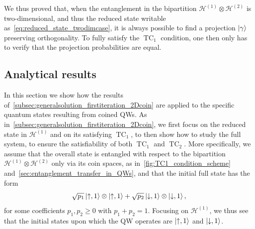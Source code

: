 \documentclass[
	aps, pra,
	superscriptaddress, twocolumn,
	floatfix,
	10pt
]{revtex4-1}
\newcommand{\on}[1]{\operatorname{#1}}
\newcommand{\parTitle}[1]{\noindent{\color{Mahogany}(\emph{#1})}}
\newcommand{\calH}{{\mathcal{H}}}
\newcommand{\commale}[1]{{\textcolor{red} {\it{[Note (Ale): #1]}}}}
\begin{document}
We thus proved that, when the entanglement in the bipartition $\calH^{(1)}\otimes\calH^{(2)}$ is two-dimensional, and thus the reduced state writable as~\cref{eq:reduced_state_twodimcase}, it is always possible to find a projection $\ket\gamma$ preserving orthogonality.
To fully satisfy the $\on{TC}_1$ condition, one then only has to verify that the projection probabilities are equal.

\subsection{Analytical results}
\label{subsec:analytical_results_QWs}

\parTitle{Section outline}
In this section we show how the results of~\cref{subsec:generalsolution_firstiteration_2Dcoin} are applied to the specific quantum states resulting from coined QWs.
As in~\cref{subsec:generalsolution_firstiteration_2Dcoin}, we first focus on the reduced state in $\calH^{(1)}$ and on its satisfying $\on{TC}_1$, to then show how to study the full system, to ensure the satisfiability of both $\on{TC}_1$ and $\on{TC}_2$.
More specifically, we assume that the overall state is entangled with respect to the bipartition $\calH^{(1)}\otimes\calH^{(2)}$ only via its coin spaces, as in~\cref{fig:TC1_condition_scheme} and~\cref{sec:entanglement_transfer_in_QWs}, and that the initial full state has the form
\begin{equation}
    \sqrt{p_1} \ket{\uparrow,1}\otimes\ket{\uparrow,1} +
    \sqrt{p_2} \ket{\downarrow,1}\otimes\ket{\downarrow,1},
\end{equation}
for some coefficients $p_1,p_2\ge0$ with $p_1+p_2=1$.
Focusing on $\calH^{(1)}$, we thus see that the initial states upon which the QW operates are $\ket{\uparrow,1}$ and $\ket{\downarrow,1}$.
\end{document}
